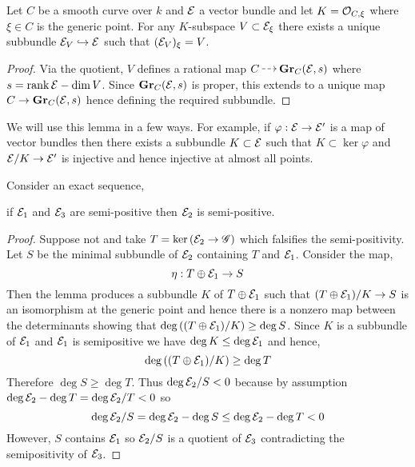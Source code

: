 \documentclass[12pt]{article}
\begin{document}
\begin{lemma}
Let $C$ be a smooth curve over $k$ and $\mathcal{E}$ a vector bundle and let $K = \mathcal{O}_{C, \xi}$ where $\xi \in C$ is the generic point. For any $K$-subspace $V \subset \mathcal{E}_\xi$ there exists a unique subbundle $\mathcal{E}_V \hookrightarrow \mathcal{E}$ such that $(\mathcal{E}_V)_\xi = V$.
\end{lemma}

\begin{proof}
Via the quotient, $V$ defines a rational map $C \rat \Gr_{C}(\E, s)$ where $s = \operatorname{\mathrm{rank}}{\mathcal{E}} - \dim{V}$. Since $\mathbf{Gr}_{C}(\mathcal{E}, s)$ is proper, this extends to a unique map $C \to \mathbf{Gr}_{C}(\mathcal{E}, s)$ hence defining the required subbundle.
\end{proof}

\begin{rmk}
We will use this lemma in a few ways. For example, if $\varphi : \mathcal{E} \to \mathcal{E}'$ is a map of vector bundles then there exists a subbundle $K \subset \mathcal{E}$ such that $K \subset \ker{\varphi}$ and $\mathcal{E} / K \to \mathcal{E}'$ is injective and hence injective at almost all points. 
\end{rmk}

\begin{lemma}
Consider an exact sequence,
\begin{center}
\end{center}
if $\mathcal{E}_1$ and $\mathcal{E}_3$ are semi-positive then $\mathcal{E}_2$ is semi-positive.
\end{lemma}

\begin{proof}
Suppose not and take $T = \ker{(\mathcal{E}_2 \to \mathscr{G})}$ which falsifies the semi-positivity. Let $S$ be the minimal subbundle of $\mathcal{E}_2$ containing $T$ and $\mathcal{E}_1$. Consider the map,
\[ \eta : T \oplus \mathcal{E}_1 \to S \]
Then the lemma produces a subbundle $K$ of $T \oplus \mathcal{E}_1$ such that $(T \oplus \mathcal{E}_1)/K \to S$ is an isomorphism at the generic point and hence there is a nonzero map between the determinants showing that $\deg{((T \oplus \mathcal{E}_1)/K)} \ge \deg{S}$.
Since $K$ is a subbundle of $\mathcal{E}_1$ and $\mathcal{E}_1$ is semipositive we have $\deg{K} \le \deg{\mathcal{E}_1}$ and hence, 
\[ \deg{((T \oplus \mathcal{E}_1)/K)} \ge \deg{T} \]
Therefore $\deg{S} \ge \deg{T}$. Thus $\deg{\mathcal{E}_2/S} < 0$ because by assumption $\deg{\mathcal{E}_2} - \deg{T} = \deg{\mathcal{E}_2/T} < 0$ so 
\[ \deg{\mathcal{E}_2 / S} = \deg{\mathcal{E}_2} - \deg{S} \le \deg{\mathcal{E}_2} - \deg{T} < 0 \]
However, $S$ contains $\mathcal{E}_1$ so $\mathcal{E}_2 / S$ is a quotient of $\mathcal{E}_3$ contradicting the semipositivity of $\mathcal{E}_3$. 
\end{proof}
\end{document}
